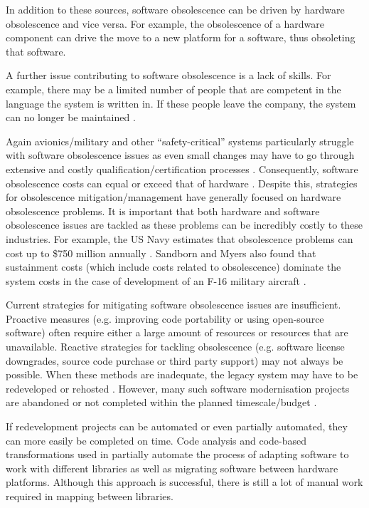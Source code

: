 \documentclass{UoYCSproject}
\begin{document}
In addition to these sources, software obsolescence can be driven by hardware obsolescence and vice versa. For example, the obsolescence of a hardware component can drive the move to a new platform for a software, thus obsoleting that software. 

A further issue contributing to software obsolescence is a lack of skills. For example, there may be a limited number of people that are competent in the language the system is written in. If these people leave the company, the system can no longer be maintained \parencite{rajagopal2014software}. 

Again avionics/military and other ``safety-critical'' systems particularly struggle with software obsolescence issues as even small changes may have to go through extensive and costly qualification/certification processes \parencite{singh2006obsolescence}. Consequently, software obsolescence costs can equal or exceed that of hardware \parencite{sandborn2007obsolescence}. Despite this, strategies for obsolescence mitigation/management have generally focused on hardware obsolescence problems. It is important that both hardware and software obsolescence issues are tackled as these problems can be incredibly costly to these industries. For example, the US Navy estimates that obsolescence problems can cost up to \$750 million annually \parencite{adams2005getting}. Sandborn and Myers also found that sustainment costs (which include costs related to obsolescence) dominate the system costs in the case of development of an F-16 military aircraft \parencite{sandborn2008designing}. 
 
Current strategies for mitigating software obsolescence issues are insufficient. Proactive measures (e.g. improving code portability or using open-source software) often require either a large amount of resources or resources that are unavailable. Reactive strategies for tackling obsolescence (e.g. software license downgrades, source code purchase or third party support) may not always be possible. When these methods are inadequate, the legacy system may have to be redeveloped or rehosted \parencite{sandborn2007obsolescence}. However, many such software modernisation projects are abandoned or not completed within the planned timescale/budget \parencite{kowalczyk2009model}. 

If redevelopment projects can be automated or even partially automated, they can more easily be completed on time.  Code analysis and code-based transformations used in \parencite{gerasimou2017technical} partially automate the process of adapting software to work with different libraries as well as migrating software between hardware platforms. Although this approach is successful, there is still a lot of manual work required in mapping between libraries.
\end{document}
